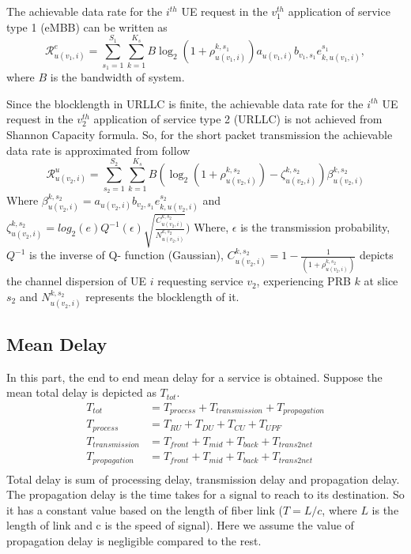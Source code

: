 \documentclass[conference]{IEEEtran}
\begin{document}
The achievable data rate for the $i^{th}$ UE request in the $v_{1}^{th}$ application of service type 1 (eMBB) can be written as
\begin{equation}\label{eq1}
\mathcal{R}_{u(v_1,i)}^{e} = \sum_{s_1=1}^{S_1}\sum_{k=1}^{K_s} B \log_2({1+ \rho_{u(v_1,i)}^{k,s_1}})a_{u(v_1,i)} b_{v_1, s_1} e^{s_1}_{k,u(v_1,i)},
\end{equation}
where $B$ is the bandwidth of system. 

Since the blocklength in URLLC is finite, the achievable data rate for the $i^{th}$ UE request in the $v_{2}^{th}$ application of service type 2 (URLLC) is not achieved from Shannon Capacity formula. So, for the short packet transmission the achievable data rate is approximated from follow
\begin{equation}\label{eq1}
\mathcal{R}_{u(v_2,i)}^{u} = \sum_{s_2=1}^{S_2}\sum_{k=1}^{K_s} B (\log_2({1+ \rho_{u(v_2,i)}^{k,s_2}})- \zeta_{u(v_2,i)}^{k,s_2}){\beta}_{u(v_2,i)}^{k,s_2}
\end{equation}
Where ${\beta}_{u(v_2,i)}^{k,s_2}=a_{u(v_2,i)} b_{v_2, s_1} e^{s_2}_{k,u(v_2,i)}$
and $\zeta_{u(v_2,i)}^{k,s_2} = log_2({e})Q^{-1}(\epsilon) \sqrt{\frac{C_{u(v_2,i)}^{k,s_2}}{N_{u(v_2,i)}^{k,s_2}}})$
Where, $\epsilon $ is the transmission probability, $Q^{-1}$ is the inverse of Q- function (Gaussian),
$C_{u(v_2,i)}^{k,s_2} = 1 - \frac{1}{(1+\rho_{u(v_2,i)}^{k,s_2})}$ depicts the channel dispersion of UE  $i$ requesting service $v_2$, experiencing PRB $k$ at slice $s_2$  and
$N_{u(v_2,i)}^{k,s_2}$ represents the blocklength of it. 

\subsection{Mean Delay}
In this part, the end to end mean delay for a service is obtained.
Suppose the mean total delay is depicted as $T_{tot}$.
\begin{equation}
\begin{split}
T_{tot} &=  T_{process} + T_{transmission} + T_{propagation}\\
T_{process} &=  T_{RU} + T_{DU} + T_{CU} + T_{UPF}\\
T_{transmission} &= T_{front} + T_{mid} + T_{back} + T_{trans2net} \\
T_{propagation} &= T_{front} + T_{mid} + T_{back} + T_{trans2net} \\
\end{split}
\end{equation}
Total delay is sum of processing delay, transmission delay and propagation delay. 
The propagation delay is the time takes for a signal to reach to its destination. So it has a constant value based on the length of fiber link ($T = L/c$, where $L$ is the length of link and c is the speed of signal).
Here we assume the value of propagation delay is negligible compared to the rest.
\end{document}
